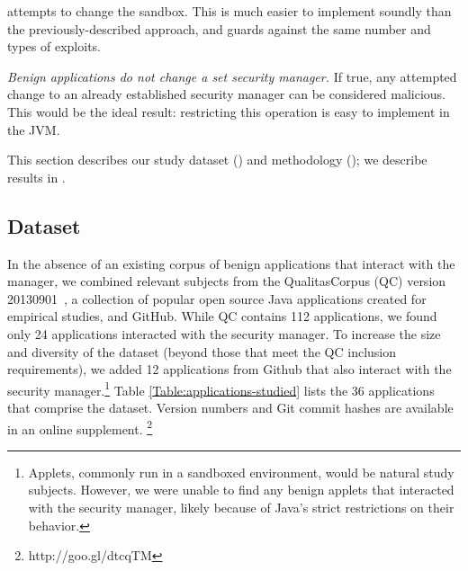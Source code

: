 \documentclass{sig-alternate}
\begin{document}
\begin{flushenum}
  attempts to change the sandbox. This is much easier to implement soundly than
  the previously-described approach, and guards against the same number and types of
  exploits.
\item \textit{Benign applications do not change a set security manager.} If
  true, any attempted change to an already established security manager can be
  considered malicious. This would be the ideal result: restricting this
  operation is easy to implement in the JVM.
\end{flushenum}

\noindent This section describes our study dataset () and
methodology (); we describe results in . 

\subsection{Dataset}\label{sec:Applications-Studied}

In the absence of an existing corpus of
benign applications that interact with the manager, %
we combined relevant subjects from 
the QualitasCorpus (QC) version 20130901~\cite{QualitasCorpus:APSEC:2010}, a 
collection of popular open source Java applications created for empirical
studies, and GitHub.
While QC contains 112 applications, we found only 24 applications interacted with 
the security manager.  To increase the size and diversity of the dataset (beyond
those that meet the QC inclusion requirements), we
added 12 applications from Github that also interact with the security manager.\footnote{Applets, commonly
run in a sandboxed environment, would be natural study subjects.  However, we were unable
to find any benign applets that interacted with the security manager, likely
because of Java's strict restrictions on their behavior.}
 Table
\ref{Table:applications-studied} lists the 36 applications that comprise the
dataset.  Version numbers
and Git commit hashes are available in an online supplement.%
\footnote{http://goo.gl/dtcqTM}
\end{document}
